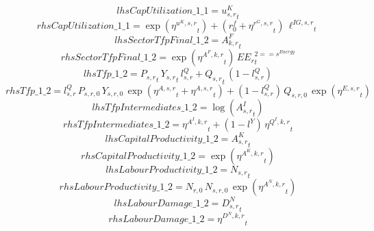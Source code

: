 \begin{dmath*}
lhsCapUtilization\_1\_1 = {{u^K_{s,r}}}_{t}
\end{dmath*}
\begin{dmath*}
rhsCapUtilization\_1\_1 = \exp\left({{\eta^{u^K,s,r}}}_{t}\right)+\left({{r^f_0}}+{{\eta^{r^G,s,r}}}_{t}\right)\, {{\ell^{IG,s,r}}}_{t}
\end{dmath*}
\begin{dmath*}
lhsSectorTfpFinal\_1\_2 = {{A^{F}_{k,r}}}_{t}
\end{dmath*}
\begin{dmath*}
rhsSectorTfpFinal\_1\_2 = \exp\left({{\eta^{A^F,k,r}}}_{t}\right)\, {{EE_r}}_{t}^{2=={{s^{Energy}}}}
\end{dmath*}
\begin{dmath*}
lhsTfp\_1\_2 = {{P_{s,r}}}_{t}\, {{Y_{s,r}}}_{t}\, {{l^{Q}_{s,r}}}+{{Q_{s,r}}}_{t}\, \left(1-{{l^{Q}_{s,r}}}\right)
\end{dmath*}
\begin{dmath*}
rhsTfp\_1\_2 = {{l^{Q}_{s,r}}}\, {{P_{s,r,0}}}\, {{Y_{s,r,0}}}\, \exp\left({{\eta^{A,s,r}}}_{t}+{{\eta^{A,s,r}}}_{t}\right)+\left(1-{{l^{Q}_{s,r}}}\right)\, {{Q_{s,r,0}}}\, \exp\left({{\eta^{E,s,r}}}_{t}\right)
\end{dmath*}
\begin{dmath*}
lhsTfpIntermediates\_1\_2 = \log\left({{A^{I}_{s,r}}}_{t}\right)
\end{dmath*}
\begin{dmath*}
rhsTfpIntermediates\_1\_2 = {{\eta^{A^{I},k,r}}}_{t}+\left(1-{{l^{Y}}}\right)\, {{\eta^{Q^{I},k,r}}}_{t}
\end{dmath*}
\begin{dmath*}
lhsCapitalProductivity\_1\_2 = {{A^{K}_{s,r}}}_{t}
\end{dmath*}
\begin{dmath*}
rhsCapitalProductivity\_1\_2 = \exp\left({{\eta^{A^{K},k,r}}}_{t}\right)
\end{dmath*}
\begin{dmath*}
lhsLabourProductivity\_1\_2 = {{N_{s,r}}}_{t}
\end{dmath*}
\begin{dmath*}
rhsLabourProductivity\_1\_2 = {{N_{r,0}}}\, {{N_{s,r,0}}}\, \exp\left({{\eta^{A^{N},k,r}}}_{t}\right)
\end{dmath*}
\begin{dmath*}
lhsLabourDamage\_1\_2 = {{D^N_{s,r}}}_{t}
\end{dmath*}
\begin{dmath*}
rhsLabourDamage\_1\_2 = {{\eta^{D^{N},k,r}}}_{t}
\end{dmath*}
